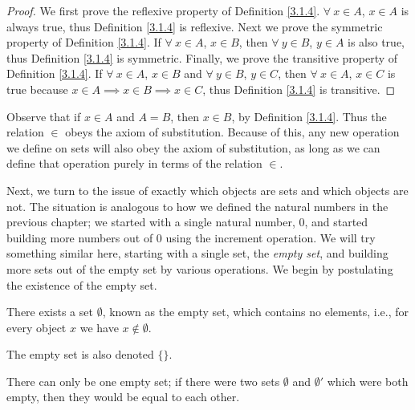 \begin{proof}
We first prove the reflexive property of Definition \ref{3.1.4}.
\(\forall\ x \in A\), \(x \in A\) is always true, thus Definition \ref{3.1.4} is reflexive.
Next we prove the symmetric property of Definition \ref{3.1.4}.
If \(\forall\ x \in A\), \(x \in B\), then \(\forall\ y \in B\), \(y \in A\) is also true, thus Definition \ref{3.1.4} is symmetric.
Finally, we prove the transitive property of Definition \ref{3.1.4}.
If \(\forall\ x \in A\), \(x \in B\) and \(\forall\ y \in B\), \(y \in C\), then \(\forall\ x \in A\), \(x \in C\) is true because \(x \in A \implies x \in B \implies x \in C\), thus Definition \ref{3.1.4} is transitive.
\end{proof}

\begin{note}
Observe that if \(x \in A\) and \(A = B\), then \(x \in B\), by Definition \ref{3.1.4}.
Thus the  relation \(\in\) obeys the axiom of substitution.
Because of this, any new operation we define on sets will also obey the axiom of substitution, as long as we can define that operation purely in terms of the relation \(\in\).
\end{note}

\begin{note}
Next, we turn to the issue of exactly which objects are sets and which objects are not.
The situation is analogous to how we defined the natural numbers in the previous chapter;
we started with a single natural number, \(0\), and started building more numbers out of \(0\) using the increment operation.
We will try something similar here, starting with a single set, the \emph{empty set},
and building more sets out of the empty set by various operations.
We begin by postulating the existence of the empty set.
\end{note}

\begin{axiom}\label{3.2}
There exists a set \(\emptyset\), known as the empty set, which contains no elements, i.e., for every object \(x\) we have \(x \notin \emptyset\).
\end{axiom}

\begin{note}
The empty set is also denoted \(\{\}\).
\end{note}

\begin{additional corollary}\label{ac 3.1.2}
There can only be one empty set;
if there were two sets \(\emptyset\) and \(\emptyset'\) which were both empty, then they would be equal to each other.
\end{additional corollary}

